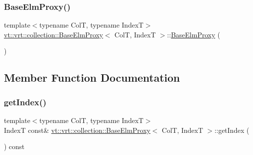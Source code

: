\subsubsection{\texorpdfstring{Base\+Elm\+Proxy()}{BaseElmProxy()}\hspace{0.1cm}{\footnotesize\ttfamily [5/5]}}
{\footnotesize\ttfamily template$<$typename ColT, typename IndexT$>$ \\
\hyperlink{structvt_1_1vrt_1_1collection_1_1_base_elm_proxy}{vt\+::vrt\+::collection\+::\+Base\+Elm\+Proxy}$<$ ColT, IndexT $>$\+::\hyperlink{structvt_1_1vrt_1_1collection_1_1_base_elm_proxy}{Base\+Elm\+Proxy} (\begin{DoxyParamCaption}\item[{\hyperlink{structvt_1_1vrt_1_1collection_1_1_base_elm_proxy}{Base\+Elm\+Proxy}$<$ ColT, IndexT $>$ \&\&}]{ }\end{DoxyParamCaption})\hspace{0.3cm}{\ttfamily [default]}}



\subsection{Member Function Documentation}
\mbox{\label{structvt_1_1vrt_1_1collection_1_1_base_elm_proxy_a9f68c8d29d3fc1f646f01c9ff890e71b}} 
\subsubsection{\texorpdfstring{get\+Index()}{getIndex()}}
{\footnotesize\ttfamily template$<$typename ColT, typename IndexT$>$ \\
IndexT const\& \hyperlink{structvt_1_1vrt_1_1collection_1_1_base_elm_proxy}{vt\+::vrt\+::collection\+::\+Base\+Elm\+Proxy}$<$ ColT, IndexT $>$\+::get\+Index (\begin{DoxyParamCaption}{ }\end{DoxyParamCaption}) const\hspace{0.3cm}{\ttfamily [inline]}}

\mbox{\label{structvt_1_1vrt_1_1collection_1_1_base_elm_proxy_a1476221ddb300382b04f2e8fb4a0adfe}} 
